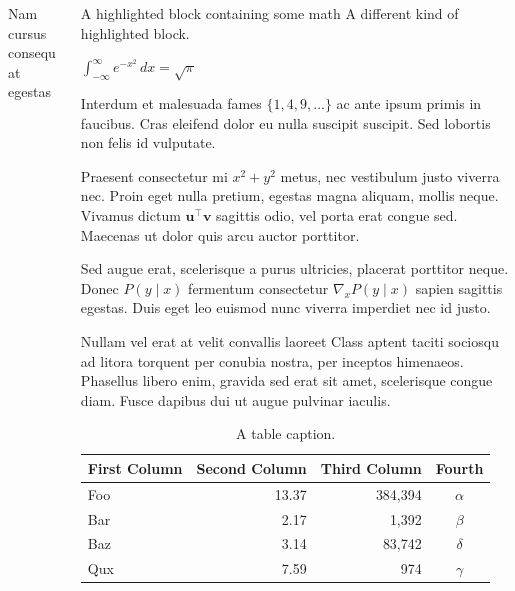 \documentclass[final]{beamer}
\newlength{\sepwidth}
\newcommand{\separatorcolumn}{\begin{column}{\sepwidth}\end{column}}
\begin{document}
\begin{frame}[label={sec:org5a641b0}]{}
\begin{columns}
\begin{column}{0.3\columnwidth}
\begin{block}{Nam cursus consequat egestas}
\end{block}
\end{column}

\begin{column}{0.3\columnwidth}
\begin{exampleblock}{A highlighted block containing some math}
A different kind of highlighted block.

\(\int_{-\infty}^{\infty} e^{-x^2}\,dx = \sqrt{\pi}\)

Interdum et malesuada fames \(\{1, 4, 9, \ldots\}\) ac ante ipsum primis in
faucibus. Cras eleifend dolor eu nulla suscipit suscipit. Sed lobortis non felis
id vulputate.

{}

Praesent consectetur mi \(x^2 + y^2\) metus, nec vestibulum justo viverra
nec. Proin eget nulla pretium, egestas magna aliquam, mollis neque. Vivamus
dictum \(\mathbf{u}^\intercal\mathbf{v}\) sagittis odio, vel porta erat congue
sed. Maecenas ut dolor quis arcu auctor porttitor.


Sed augue erat, scelerisque a purus ultricies, placerat porttitor neque.
Donec \(P(y \mid x)\) fermentum consectetur \(\nabla_x P(y \mid x)\) sapien
sagittis egestas. Duis eget leo euismod nunc viverra imperdiet nec id
justo.
\end{exampleblock}

\begin{block}{Nullam vel erat at velit convallis laoreet}
Class aptent taciti sociosqu ad litora torquent per conubia nostra, per
inceptos himenaeos. Phasellus libero enim, gravida sed erat sit amet,
scelerisque congue diam. Fusce dapibus dui ut augue pulvinar iaculis.

\begin{table}[htbp]
\caption{A table caption.}
\centering
\footnotesize
\begin{tabular}{lrrc}
First Column & Second Column & Third Column & Fourth\\[0pt]
\hline
Foo & 13.37 & 384,394 & \(\alpha\)\\[0pt]
Bar & 2.17 & 1,392 & \(\beta\)\\[0pt]
Baz & 3.14 & 83,742 & \(\delta\)\\[0pt]
Qux & 7.59 & 974 & \(\gamma\)\\[0pt]
\end{tabular}
\end{table}


\end{block}
\end{column}
\end{columns}
\end{frame}
\end{document}
